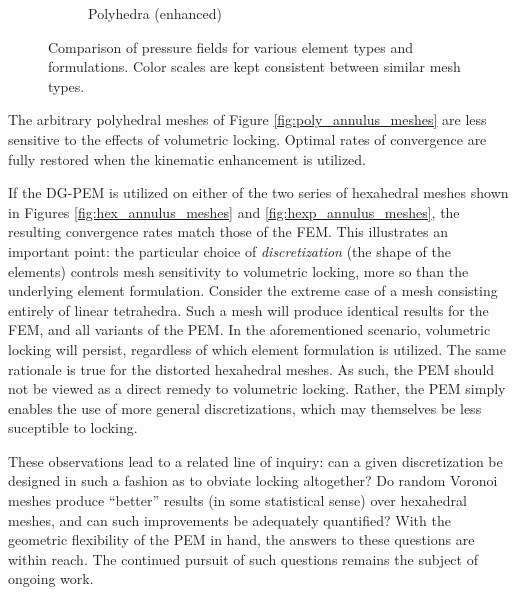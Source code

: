 \begin{figure}[!h]
\begin{subfigure}[b]{0.32\linewidth}
    			\caption{Polyhedra (enhanced) \label{fig:poly_fbar_pressure}}
    \end{subfigure} 
    \caption{Comparison of pressure fields for various element types and formulations. Color scales are kept consistent between similar mesh types.}
  \label{fig:twisting_annulus_stresses}
\end{figure}

The arbitrary polyhedral meshes of Figure \ref{fig:poly_annulus_meshes} are less sensitive to the effects of volumetric locking. Optimal rates of convergence are fully restored when the kinematic enhancement is utilized.

If the DG-PEM is utilized on either of the two series of hexahedral meshes shown in Figures \ref{fig:hex_annulus_meshes} and \ref{fig:hexp_annulus_meshes}, the resulting convergence rates match those of the FEM. This illustrates an important point: the particular choice of \textit{discretization} (the shape of the elements) controls mesh sensitivity to volumetric locking, more so than the underlying element formulation. Consider the extreme case of a mesh consisting entirely of linear tetrahedra. Such a mesh will produce identical results for the FEM, and all variants of the PEM. In the aforementioned scenario, volumetric locking will persist, regardless of which element formulation is utilized. The same rationale is true for the distorted hexahedral meshes. As such, the PEM should not be viewed as a direct remedy to volumetric locking. Rather, the PEM simply enables the use of more general discretizations, which may themselves be less suceptible to locking.

These observations lead to a related line of inquiry: can a given discretization be designed in such a fashion as to obviate locking altogether? Do random Voronoi meshes produce ``better'' results (in some statistical sense) over hexahedral meshes, and can such improvements be adequately quantified? With the geometric flexibility of the PEM in hand, the answers to these questions are within reach. The continued pursuit of such questions remains the subject of ongoing work.

%
%
%
%

